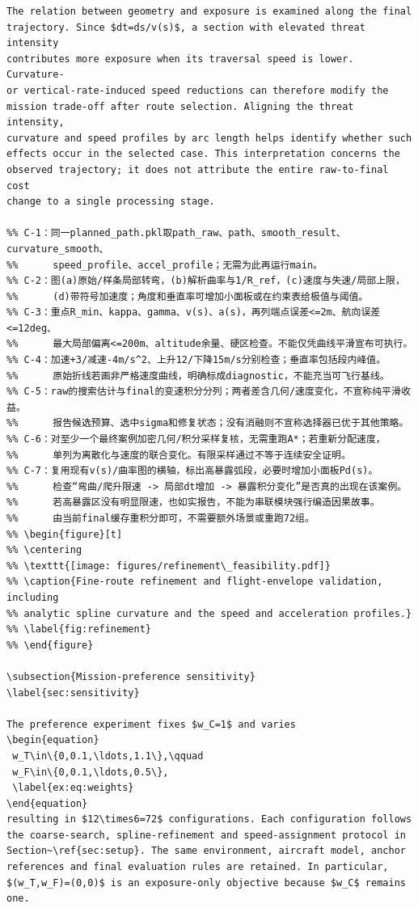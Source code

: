 \documentclass[12pt]{article}
\begin{document}
\begin{verbatim}
The relation between geometry and exposure is examined along the final
trajectory. Since $dt=ds/v(s)$, a section with elevated threat intensity
contributes more exposure when its traversal speed is lower. Curvature-
or vertical-rate-induced speed reductions can therefore modify the
mission trade-off after route selection. Aligning the threat intensity,
curvature and speed profiles by arc length helps identify whether such
effects occur in the selected case. This interpretation concerns the
observed trajectory; it does not attribute the entire raw-to-final cost
change to a single processing stage.

%% C-1：同一planned_path.pkl取path_raw、path、smooth_result、curvature_smooth、
%%      speed_profile、accel_profile；无需为此再运行main。
%% C-2：图(a)原始/样条局部转弯，(b)解析曲率与1/R_ref，(c)速度与失速/局部上限，
%%      (d)带符号加速度；角度和垂直率可增加小面板或在约束表给极值与阈值。
%% C-3：重点R_min、kappa、gamma、v(s)、a(s)，再列端点误差<=2m、航向误差<=12deg、
%%      最大局部偏离<=200m、altitude余量、硬区检查。不能仅凭曲线平滑宣布可执行。
%% C-4：加速+3/减速-4m/s^2、上升12/下降15m/s分别检查；垂直率包括段内峰值。
%%      原始折线若画非严格速度曲线，明确标成diagnostic，不能充当可飞行基线。
%% C-5：raw的搜索估计与final的变速积分分列；两者差含几何/速度变化，不宣称纯平滑收益。
%%      报告候选预算、选中sigma和修复状态；没有消融则不宣称选择器已优于其他策略。
%% C-6：对至少一个最终案例加密几何/积分采样复核，无需重跑A*；若重新分配速度，
%%      单列为离散化与速度的联合变化。有限采样通过不等于连续安全证明。
%% C-7：复用现有v(s)/曲率图的横轴，标出高暴露弧段，必要时增加小面板Pd(s)。
%%      检查“弯曲/爬升限速 -> 局部dt增加 -> 暴露积分变化”是否真的出现在该案例。
%%      若高暴露区没有明显限速，也如实报告，不能为串联模块强行编造因果故事。
%%      由当前final缓存重积分即可，不需要额外场景或重跑72组。
%% \begin{figure}[t]
%% \centering
%% \texttt{[image: figures/refinement\_feasibility.pdf]}
%% \caption{Fine-route refinement and flight-envelope validation, including
%% analytic spline curvature and the speed and acceleration profiles.}
%% \label{fig:refinement}
%% \end{figure}

\subsection{Mission-preference sensitivity}
\label{sec:sensitivity}

The preference experiment fixes $w_C=1$ and varies
\begin{equation}
 w_T\in\{0,0.1,\ldots,1.1\},\qquad
 w_F\in\{0,0.1,\ldots,0.5\},
 \label{ex:eq:weights}
\end{equation}
resulting in $12\times6=72$ configurations. Each configuration follows
the coarse-search, spline-refinement and speed-assignment protocol in
Section~\ref{sec:setup}. The same environment, aircraft model, anchor
references and final evaluation rules are retained. In particular,
$(w_T,w_F)=(0,0)$ is an exposure-only objective because $w_C$ remains one.


\end{verbatim}
\end{document}
